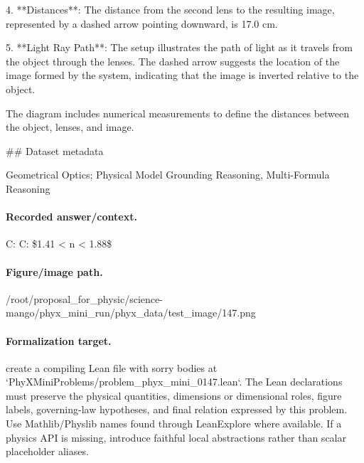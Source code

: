 4. **Distances**: The distance from the second lens to the resulting image, represented by a dashed arrow pointing downward, is 17.0 cm.

5. **Light Ray Path**: The setup illustrates the path of light as it travels from the object through the lenses. The dashed arrow suggests the location of the image formed by the system, indicating that the image is inverted relative to the object.

The diagram includes numerical measurements to define the distances between the object, lenses, and image.

\#\# Dataset metadata

Geometrical Optics; Physical Model Grounding Reasoning, Multi-Formula Reasoning

\paragraph{Recorded answer/context.}
C: C: \$1.41 < n < 1.88\$

\paragraph{Figure/image path.}
/root/proposal\_for\_physic/science-mango/phyx\_mini\_run/phyx\_data/test\_image/147.png

\paragraph{Formalization target.}
create a compiling Lean file with sorry bodies at `PhyXMiniProblems/problem\_phyx\_mini\_0147.lean`. The Lean declarations must preserve the physical quantities, dimensions or dimensional roles, figure labels, governing-law hypotheses, and final relation expressed by this problem.
Use Mathlib/Physlib names found through LeanExplore where available. If a physics API is missing, introduce faithful local abstractions rather than scalar placeholder aliases.

